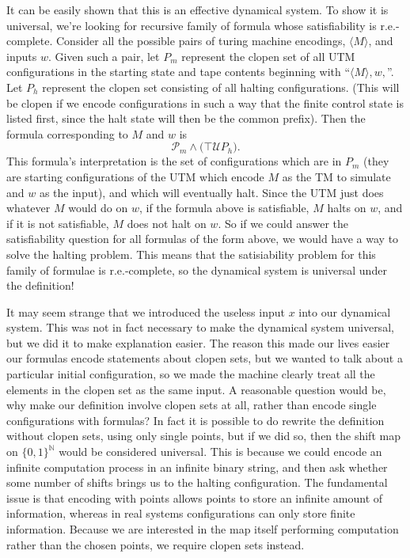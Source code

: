 \documentclass{fkpaper}
\newcommand{\ltil}{\mathcal{U}}
\newcommand{\psc}{\mathcal{P}}
\renewcommand{\Nn}{\mathbb{N}}
\begin{document}
\begin{multicols}{2}
  It can be easily shown that this is an effective dynamical system. To show it is universal, we're looking for recursive family of formula whose satisfiability is r.e.-complete. Consider all the possible pairs of turing machine encodings, $\langle M \rangle$, and inputs $w$. Given such a pair, let $P_m$ represent the clopen set of all UTM configurations in the starting state and tape contents beginning with ``$\langle M \rangle , w,$''. Let $P_{h}$ represent the clopen set consisting of all halting configurations. (This will be clopen if we encode configurations in such a way that the finite control state is listed first, since the halt state will then be the common prefix). Then the formula corresponding to $M$ and $w$ is $$ \psc_{m} \land \Big( \top \ltil P_{h} \Big).$$ This formula's interpretation is the set of configurations which are in $P_m$ (they are starting configurations of the UTM which encode $M$ as the TM to simulate and $w$ as the input), and which will eventually halt. Since the UTM just does whatever $M$ would do on $w$, if the formula above is satisfiable, $M$ halts on $w$, and if it is not satisfiable, $M$ does not halt on $w$. So if we could answer the satisfiability question for all formulas of the form above, we would have a way to solve the halting problem. This means that the satisiability problem for this family of formulae is r.e.-complete, so the dynamical system is universal under the definition!

  It may seem strange that we introduced the useless input $x$ into our dynamical system. This was not in fact necessary to make the dynamical system universal, but we did it to make explanation easier. The reason this made our lives easier our formulas encode statements about clopen sets, but we wanted to talk about a particular initial configuration, so we made the machine clearly treat all the elements in the clopen set as the same input. A reasonable question would be, why make our definition involve clopen sets at all, rather than encode single configurations with formulas? In fact it is possible to do rewrite the definition without clopen sets, using only single points, but if we did so, then the shift map on $\{0,1\}^\Nn$ would be considered universal. This is because we could encode an infinite computation process in an infinite binary string, and then ask whether some number of shifts brings us to the halting configuration. The fundamental issue is that encoding with points allows points to store an infinite amount of information, whereas in real systems configurations can only store finite information. Because we are interested in the map itself performing computation rather than the chosen points, we require clopen sets instead.


\end{multicols}
\end{document}
